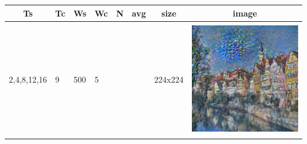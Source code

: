 \documentclass[a4paper, 11pt]{article}
\begin{document}
				\begin{longtable}{| m{2.5cm} | m{0.5cm} | m{1.2cm} | m{0.5cm} | m{0.5cm} | m{1cm} | m{1.6cm} | c |}
					\hline
					\multicolumn{1}{|c|}{Ts} & \multicolumn{1}{c|}{Tc} & \multicolumn{1}{c|}{Ws} & \multicolumn{1}{c|}{Wc} & \multicolumn{1}{c|}{N} & \multicolumn{1}{c|}{avg} & \multicolumn{1}{c|}{size } & image  \\ \hline
					2,4,8,12,16                         & 9                                   & 500                               & 5                                   &                                    &                               & 224x224                         & 
					\begin{minipage}{.3\textwidth}
						\includegraphics[width=1\linewidth, height=50mm]{pics/image2}
					\end{minipage} \\
					 

\end{longtable}
\end{document}
